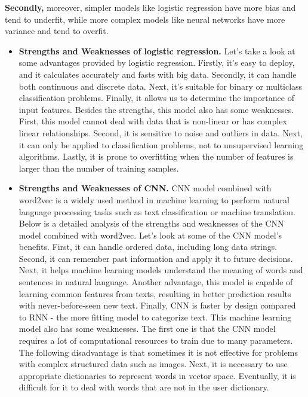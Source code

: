 \textbf{Secondly,} moreover, simpler models like logistic regression have more bias and tend to underfit, while more complex models like neural networks have more variance and tend to overfit.
\begin{itemize}
  \item \textbf{Strengths and Weaknesses of logistic regression.} 
  Let's take a look at some advantages provided by logistic regression. Firstly, it's easy to deploy, and it calculates accurately and fasts with big data. Secondly, it can handle both continuous and discrete data. Next, it's suitable for binary or multiclass classification problems. Finally, it allows us to determine the importance of input features. Besides the strengths, this model also has some weaknesses.
  First, this model cannot deal with data that is non-linear or has complex linear relationships. Second, it is sensitive to noise and outliers in data. Next, it can only be applied to classification problems, not to unsupervised learning algorithms. Lastly, it is prone to overfitting when the number of features is larger than the number of training samples.
  \item \textbf{Strengths and Weaknesses of CNN.} 
  CNN model combined with word2vec is a widely used method in machine learning to perform natural language processing tasks such as text classification or machine translation. Below is a detailed analysis of the strengths and weaknesses of the CNN model combined with word2vec.
  Let's look at some of the CNN model's benefits. First, it can handle ordered data, including long data strings. Second, it can remember past information and apply it to future decisions. Next, it helps machine learning models understand the meaning of words and sentences in natural language. Another advantage, this model is capable of learning common features from texts, resulting in better prediction results with never-before-seen new text. Finally, CNN is faster by design compared to RNN - the more fitting model to categorize text. This machine learning model also has some weaknesses. The first one is that the CNN model requires a lot of computational resources to train due to many parameters. The following disadvantage is that sometimes it is not effective for problems with complex structured data such as images. Next, it is necessary to use appropriate dictionaries to represent words in vector space. Eventually, it is difficult for it to deal with words that are not in the user dictionary. 
\end{itemize}

